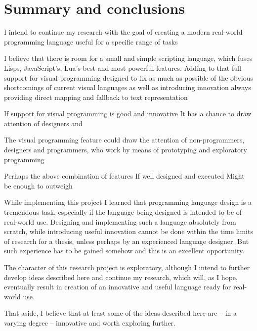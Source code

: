 \chapter{Summary and conclusions}\label{chap:summary}
I intend to continue my research with the goal of creating a modern real-world
programming language useful for a specific range of tasks

I believe that there is room for a small and simple scripting language, which fuses Lisps, JavaScript's, Lua's best and most powerful features. Adding to that full support for visual programming designed to fix as much as possible of the obvious shortcomings of current visual languages as well as introducing innovation always providing direct mapping and fallback to text representation  

If support for visual programming is good and innovative
It has a chance to draw attention of designers and 

The visual programming feature could draw the attention of non-programmers, designers and programmers, who work by means of prototyping and exploratory programming

Perhaps the above combination of features
If well designed and executed
Might be enough to outweigh \cite{pl_checklist}


While implementing this project I learned that programming language design is a
tremendous task, especially if the language being designed is intended to be of
real-world use. Designing and implementing such a language absolutely from
scratch, while introducing useful innovation cannot be done within the time
limits of research for a thesis, unless perhaps by an experienced language
designer. But such experience has to be gained somehow and this is an excellent
opportunity.

The character of this research project is exploratory, although I intend to
further develop ideas described here and continue my research, which will, as I
hope, eventually result in creation of an innovative and useful language ready
for real-world use.

That aside, I believe that at least some of the ideas described here are -- in a
varying degree -- innovative and worth exploring further.

